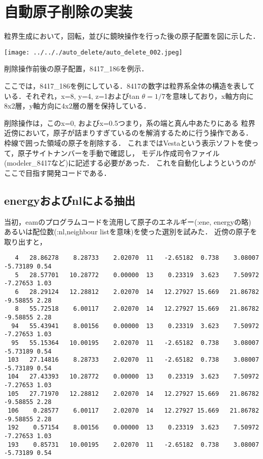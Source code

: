 \documentclass[11pt,dvipdfmx]{jsarticle}
\begin{document}
    \section{自動原子削除の実装}\label{ux81eaux52d5ux539fux5b50ux524aux9664ux306eux5b9fux88c5}

粒界生成において，回転，並びに鏡映操作を行った後の原子配置を図に示した．

\begin{center}
\texttt{[image: ../.././auto\_delete/auto\_delete\_002.jpeg]}
\end{center}
削除操作前後の原子配置，8417\_186を例示．

\label{fig:}

ここでは，8417\_186を例にしている．8417の数字は粒界系全体の構造を表している．それぞれ，x=8,
y=4, z=1およびtan
\(\theta=1/7\)を意味しており，x軸方向に8x2層，y軸方向に4x2層の層を保持している．

削除操作は，このx=0, およびx=0.5つまり，系の端と真ん中あたりにある
粒界近傍において，原子が詰まりすぎているのを解消するために行う操作である．
枠線で囲った領域の原子を削除する．
これまではVestaという表示ソフトを使って，原子サイトナンバーを手動で確認し，
モデル作成司令ファイル(modeler\_8417など)に記述する必要があった．
これを自動化しようというのがここで目指す開発コードである．

    \subsection{energyおよびnlによる抽出}\label{energyux304aux3088ux3073nlux306bux3088ux308bux62bdux51fa}

    当初，eamのプログラムコードを流用して原子のエネルギー(:ene, energyの略)
あるいは配位数(:nl,neighbour listを意味)を使った選別を試みた．
近傍の原子を取り出すと，

\begin{verbatim}
   4   28.86278    8.28733    2.02070  11   -2.65182  0.738    3.08007   -5.73189 0.54
   5   28.57701   10.28772    0.00000  13    0.23319  3.623    7.50972   -7.27653 1.03
   6   28.29124   12.28812    2.02070  14   12.27927 15.669   21.86782   -9.58855 2.28
   8   55.72518    6.00117    2.02070  14   12.27927 15.669   21.86782   -9.58855 2.28
  94   55.43941    8.00156    0.00000  13    0.23319  3.623    7.50972   -7.27653 1.03
  95   55.15364   10.00195    2.02070  11   -2.65182  0.738    3.08007   -5.73189 0.54
 103   27.14816    8.28733    2.02070  11   -2.65182  0.738    3.08007   -5.73189 0.54
 104   27.43393   10.28772    0.00000  13    0.23319  3.623    7.50972   -7.27653 1.03
 105   27.71970   12.28812    2.02070  14   12.27927 15.669   21.86782   -9.58855 2.28
 106    0.28577    6.00117    2.02070  14   12.27927 15.669   21.86782   -9.58855 2.28
 192    0.57154    8.00156    0.00000  13    0.23319  3.623    7.50972   -7.27653 1.03
 193    0.85731   10.00195    2.02070  11   -2.65182  0.738    3.08007   -5.73189 0.54
\end{verbatim}
\end{document}
